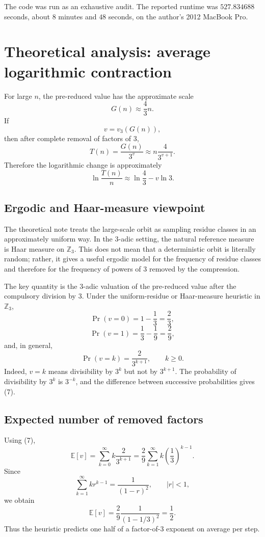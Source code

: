 \documentclass[11pt]{article}
\begin{document}
The code was run as an exhaustive audit. The reported runtime was $527.834688$ seconds, about $8$ minutes and $48$ seconds, on the author's 2012 MacBook Pro.

\section{Theoretical analysis: average logarithmic contraction}
For large $n$, the pre-reduced value has the approximate scale
\[
G(n)\approx\frac43n.
\]
If
\[
v=v_3(G(n)),
\]
then after complete removal of factors of $3$,
\[
T(n)=\frac{G(n)}{3^v}
\approx n\frac{4}{3^{v+1}}.
\tag{5}
\]
Therefore the logarithmic change is approximately
\[
\ln\frac{T(n)}n
\approx \ln\frac43-v\ln3.
\tag{6}
\]

\subsection{Ergodic and Haar-measure viewpoint}
The theoretical note treats the large-scale orbit as sampling residue classes in an approximately uniform way. In the $3$-adic setting, the natural reference measure is Haar measure on $\mathbb Z_3$. This does not mean that a deterministic orbit is literally random; rather, it gives a useful ergodic model for the frequency of residue classes and therefore for the frequency of powers of $3$ removed by the compression.

The key quantity is the $3$-adic valuation of the pre-reduced value after the compulsory division by $3$. Under the uniform-residue or Haar-measure heuristic in $\mathbb Z_3$,
\[
\Pr(v=0)=1-\frac13=\frac23,
\]
\[
\Pr(v=1)=\frac13-\frac19=\frac29,
\]
and, in general,
\[
\Pr(v=k)=\frac{2}{3^{k+1}},
\qquad k\ge0.
\tag{7}
\]
Indeed, $v=k$ means divisibility by $3^k$ but not by $3^{k+1}$. The probability of divisibility by $3^k$ is $3^{-k}$, and the difference between successive probabilities gives (7).

\subsection{Expected number of removed factors}
Using (7),
\[
\mathbb E[v]
=\sum_{k=0}^{\infty}k\frac{2}{3^{k+1}}
=\frac{2}{9}\sum_{k=1}^{\infty}k\left(\frac13\right)^{k-1}.
\]
Since
\[
\sum_{k=1}^{\infty}kr^{k-1}=\frac{1}{(1-r)^2},
\qquad |r|<1,
\]
we obtain
\[
\mathbb E[v]
=\frac{2}{9}\frac{1}{(1-1/3)^2}
=\frac12.
\tag{8}
\]
Thus the heuristic predicts one half of a factor-of-$3$ exponent on average per step.
\end{document}
